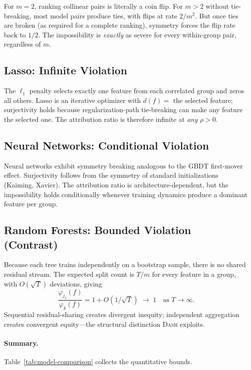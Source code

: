\documentclass{article}
\newcommand{\DASH}{\textsc{Dash}}
\newcommand{\GBDT}{\textsc{GBDT}}
\begin{document}
For $m = 2$, ranking collinear pairs is literally a coin flip. For $m > 2$ without tie-breaking, most model pairs produce ties, with flips at rate $2/m^2$. But once ties are broken (as required for a complete ranking), symmetry forces the flip rate back to $1/2$. The impossibility is \emph{exactly} as severe for every within-group pair, regardless of $m$.

\subsection{Lasso: Infinite Violation}
\label{sec:lasso}

The $\ell_1$ penalty selects exactly one feature from each correlated group and zeros all others. Lasso is an iterative optimizer with $d(f) =$ the selected feature; surjectivity holds because regularization-path tie-breaking can make any feature the selected one. The attribution ratio is therefore infinite at \emph{any} $\rho > 0$.

\subsection{Neural Networks: Conditional Violation}
\label{sec:nn}

Neural networks exhibit symmetry breaking analogous to the \GBDT{} first-mover effect. Surjectivity follows from the symmetry of standard initializations (Kaiming, Xavier). The attribution ratio is architecture-dependent, but the impossibility holds conditionally whenever training dynamics produce a dominant feature per group.

\subsection{Random Forests: Bounded Violation (Contrast)}
\label{sec:rf}

Because each tree trains independently on a bootstrap sample, there is no shared residual stream. The expected split count is $T/m$ for every feature in a group, with $O(\sqrt{T})$ deviations, giving
\[
    \frac{\varphi_{j_1}(f)}{\varphi_k(f)} = 1 + O(1/\sqrt{T}) \;\to\; 1 \quad \text{as } T \to \infty.
\]
Sequential residual-sharing creates divergent inequity; independent aggregation creates convergent equity---the structural distinction \DASH{} exploits.

\paragraph{Summary.}
Table~\ref{tab:model-comparison} collects the quantitative bounds.
\end{document}
